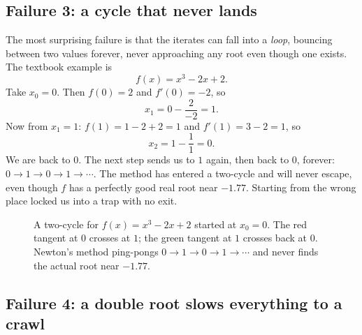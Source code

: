 \subsection{Failure 3: a cycle that never lands}

The most surprising failure is that the iterates can fall into a \emph{loop},
bouncing between two values forever, never approaching any root even though one
exists. The textbook example is
\[
  f(x) = x^3 - 2x + 2.
\]
Take $x_0 = 0$. Then $f(0) = 2$ and $f'(0) = -2$, so
\[
  x_1 = 0 - \frac{2}{-2} = 1.
\]
Now from $x_1 = 1$: $f(1) = 1 - 2 + 2 = 1$ and $f'(1) = 3 - 2 = 1$, so
\[
  x_2 = 1 - \frac{1}{1} = 0.
\]
We are back to $0$. The next step sends us to $1$ again, then back to $0$, forever:
$0 \to 1 \to 0 \to 1 \to \cdots$. The method has entered a two-cycle and will never
escape, even though $f$ has a perfectly good real root near $-1.77$. Starting from
the wrong place locked us into a trap with no exit.

\begin{figure}[H]
\centering
{}
\caption{A two-cycle for $f(x)=x^3-2x+2$ started at $x_0=0$. The red tangent at
$0$ crosses at $1$; the green tangent at $1$ crosses back at $0$. Newton's method
ping-pongs $0\to1\to0\to1\to\cdots$ and never finds the actual root near $-1.77$.}
\label{ch19:fig-cycle}
\end{figure}

\subsection{Failure 4: a double root slows everything to a crawl}

